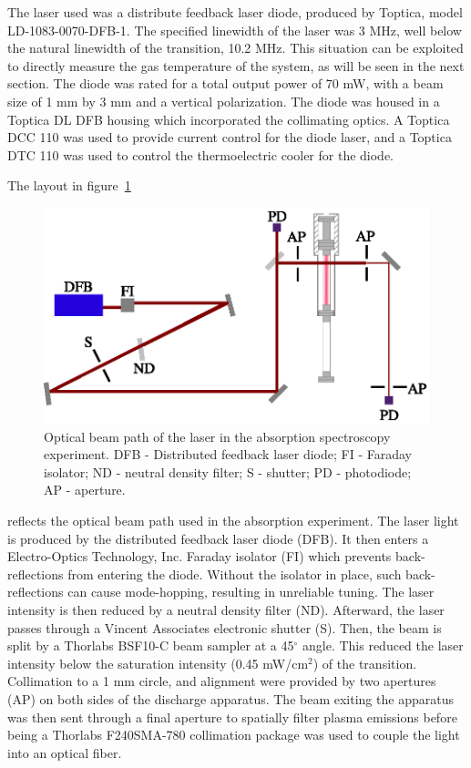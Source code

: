The laser used was a distribute feedback laser diode, produced by Toptica, model
LD-1083-0070-DFB-1. The specified linewidth of the laser was 3 MHz, well below
the natural linewidth of the transition, 10.2 MHz. This situation can be
exploited to directly measure the gas temperature of the system, as will be seen
in the next section. The diode was rated for a total output power of 70 mW, with
a beam size of 1 mm by 3 mm and a vertical polarization. The diode was housed in
a Toptica DL DFB housing which incorporated the collimating optics. A Toptica
DCC 110 was used to provide current control for the diode laser, and a Toptica
DTC 110 was used to control the thermoelectric cooler for the diode.

The layout in figure~\ref{fig:laser}
\begin{figure}
  \centering
  \includegraphics{./chapters/metastables/figures/laser.eps}
  \caption{Optical beam path of the laser in the absorption spectroscopy
  experiment. DFB - Distributed feedback laser diode; FI - Faraday isolator; ND -
  neutral density filter; S - shutter; PD - photodiode; AP - aperture.}
  \label{fig:laser}
\end{figure}
reflects the optical beam path used in the absorption experiment. The laser
light is produced by the distributed feedback laser diode (DFB). It then enters
a Electro-Optics Technology, Inc. Faraday isolator (FI) which prevents
back-reflections from entering the diode. Without the isolator in place, such
back-reflections can cause mode-hopping, resulting in unreliable tuning. The
laser intensity is then reduced by a neutral density filter (ND). Afterward, the
laser passes through a Vincent Associates electronic shutter (S). Then, the beam
is split by a Thorlabs BSF10-C beam sampler at a 45$^\circ$ angle. This reduced
the laser intensity below the saturation intensity (0.45 mW/cm$^2$) of the
transition. Collimation to a 1 mm circle, and alignment were provided by two
apertures (AP) on both sides of the discharge apparatus. The beam exiting the
apparatus was then sent through a final aperture to spatially filter plasma
emissions before being a Thorlabs F240SMA-780 collimation package was used to
couple the light into an optical fiber.

